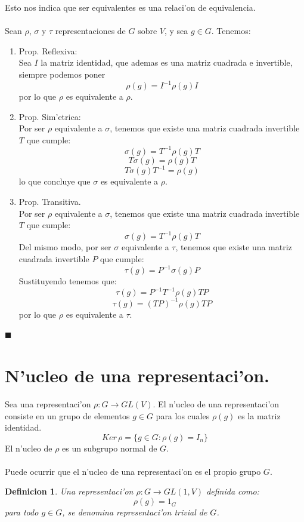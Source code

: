 \documentclass[a4paper,openright,12pt]{book}
\numberwithin{equation}{section} %
\newtheorem{definicion}{Definicion}[section] %
\newenvironment{proof}{\noindent{\it Demostracion:}}{\hfill$\blacksquare$} %
\begin{document}
Esto nos indica que ser equivalentes es una relaci'on de equivalencia.\\
\\
\begin{proof}
Sean $\rho$, $\sigma$ y $\tau$ representaciones de $G$ sobre $V$, y sea $g \in G$. Tenemos:
\begin{enumerate}
\item Prop. Reflexiva:\\
Sea $I$ la matriz identidad, que ademas es una matriz cuadrada e invertible, siempre podemos poner
\[
\rho (g) = I^{-1} \rho (g) I
\]
por lo que $\rho$ es equivalente a $\rho$.
\item Prop. Sim'etrica:\\
Por ser $\rho$ equivalente a $\sigma$, tenemos que existe una matriz cuadrada invertible $T$ que cumple:
\[
\sigma (g) = T^{-1}\rho (g) T
\]
\[
T \sigma (g) = \rho (g) T
\]
\[
T \sigma (g)T^{-1} = \rho (g) 
\]
lo que concluye que $\sigma$ es equivalente a $\rho$.
\item Prop. Transitiva.\\
Por ser $\rho$ equivalente a $\sigma$, tenemos que existe una matriz cuadrada invertible $T$ que cumple:
\[
\sigma (g) = T^{-1}\rho (g) T
\]
Del mismo modo, por ser $\sigma$ equivalente a $\tau$, tenemos que existe una matriz cuadrada invertible $P$ que cumple:
\[
\tau (g) = P^{-1}\sigma (g) P
\]
Sustituyendo tenemos que:
\[
\tau (g) = P^{-1}T^{-1} \rho (g)T P
\]
\[
\tau (g) = (TP)^{-1} \rho (g)T P
\]
por lo que $\rho$ es equivalente a $\tau$.
\end{enumerate}
\end{proof}
\section{N'ucleo de una representaci'on.}
Sea una representaci'on $\rho : G \rightarrow GL(V)$. El n'ucleo de una representaci'on consiste en un grupo de elementos $g \in G$ 
para los cuales $\rho (g)$ es la matriz identidad.
\[
Ker \, \rho = \{ g \in G:\rho (g) = I_{n} \}
\]
El n'ucleo de $\rho$ es un subgrupo normal de $G$.\\
\\
Puede ocurrir que el n'ucleo de una representaci'on es el propio grupo $G$.
\begin{definicion}
Una representaci'on $\rho : G \rightarrow GL(1,V)$ definida como:
\[
\rho (g) = 1_{G}
\]
para todo $g \in G$, se denomina \textit{representaci'on trivial} de $G$.
\end{definicion} 
\end{document}
